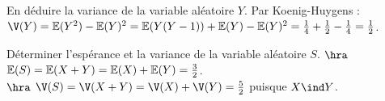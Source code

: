 \documentclass[french, 11pt]{article}
\begin{document}
\pagebreak

\begin{question}{}{}
    En déduire la variance de la variable aléatoire $Y$.
    \tcblower
    Par Koenig-Huygens : $\V(Y) = \E(Y^2) - \E(Y)^2 = \E(Y(Y-1))+\E(Y) - \E(Y)^2 = \frac{1}{4} + \frac{1}{2} - \frac{1}{4} = \frac{1}{2}$. 
\end{question}

\vspace*{-0.5cm}

\begin{question}{}{}
    Déterminer l'espérance et la variance de la variable aléatoire $S$.
    \tcblower
    $\hra$ $\mathbb{E}(S)=\mathbb{E}(X+Y)=\mathbb{E}(X) + \mathbb{E}(Y) = \frac{3}{2}$.\\
    $\hra$ $\V(S)=\V(X+Y)=\V(X) + \V(Y) = \frac{5}{2}$ puisque $X\ind Y$.
\end{question}

\fin
\end{document}
